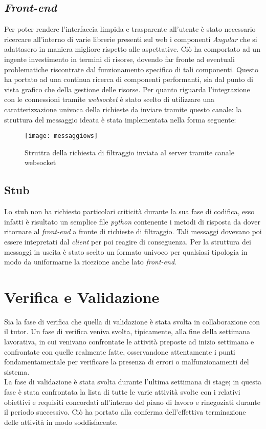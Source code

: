 \subsection{\textit{Front-end}}
Per poter rendere l'interfaccia limpida e trasparente all'utente è stato necessario ricercare all'interno di varie librerie presenti sul web i componenti \textit{Angular} che si adattasero in maniera migliore rispetto alle aspettative. Ciò ha comportato ad un ingente investimento in termini di risorse, dovendo far fronte ad eventuali problematiche riscontrate dal funzionamento specifico di tali componenti. Questo ha portato ad una continua ricerca di componenti performanti, sia dal punto di vista grafico che della gestione delle risorse.
Per quanto riguarda l'integrazione con le connessioni tramite \textit{websocket} è stato scelto di utilizzare una caratterizzazione univoca della richieste da inviare tramite questo canale: la struttura del messaggio ideata è stata implementata nella forma seguente:
\begin{figure}[!h] 
	\centering 
	\texttt{[image: messaggiows]} 
	\caption{Struttra della richiesta di filtraggio inviata al server tramite canale websocket}
\end{figure}
\subsection{Stub}
Lo stub non ha richiesto particolari criticità durante la sua fase di codifica, esso infatti è risultato un semplice file \textit{python} contenente i metodi di risposta da dover ritornare al \textit{front-end} a fronte di richieste di filtraggio. Tali messaggi dovevano poi essere intepretati dal \textit{client} per poi reagire di conseguenza. Per la struttura dei messaggi in uscita è stato scelto un formato univoco per qualsiasi tipologia in modo da uniformarne la ricezione anche lato \textit{front-end}.

\section{Verifica e Validazione}
Sia la fase di verifica che quella di validazione è stata svolta in collaborazione con il tutor. Un fase di verifica veniva svolta, tipicamente, alla fine della settimana lavorativa, in cui venivano confrontate le attività preposte ad inizio settimana e confrontate con quelle realmente fatte, osservandone attentamente i punti fondamentamentale per verificare la presenza di errori o malfunzionamenti del sistema.\\ La fase di validazione è stata svolta durante l'ultima settimana di stage; in questa fase è stata confrontata la lista di tutte le varie attività svolte con i relativi obiettivi e requisiti concordati all'interno del piano di lavoro e rinegoziati durante il periodo successivo. Ciò ha portato alla conferma dell'effettiva terminazione delle attività in modo soddisfacente. 

